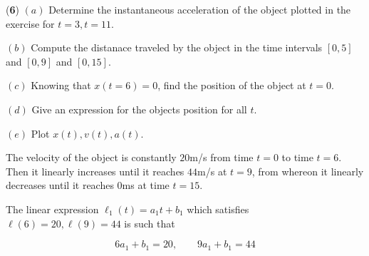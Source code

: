 \documentclass[12pt]{article}
\theoremstyle{definition}
\begin{document}
\vspace{1cm}


\vspace{1cm}


\pagebreak 

\begin{shaded}
    (\textbf{6}) $(a)$ Determine the instantaneous acceleration of the object
    plotted in the exercise for $t = 3, t = 11$.

    $(b)$ Compute the distanace traveled by the object in the time intervals
    $[0, 5]$ and $[0, 9]$ and $[0, 15]$.

    $(c)$ Knowing that $x(t = 6) = 0$, find the position of the object at $t =
    0$. 

    $(d)$ Give an expression for the objects position for all $t$. 

    $(e)$ Plot $x(t), v(t), a(t)$.
\end{shaded}

The velocity of the object is constantly $20$m/s from time $t = 0$ to time $t =
6$. Then it linearly increases until it reaches $44$m/s at $t=9$, from whereon
it linearly decreases until it reaches $0$ms at time $t = 15$.

The linear expression $\ell_1(t) = a_1t + b_1$ which satisfies $\ell(6)=20,
\ell(9) = 44$ is such that 

\begin{equation*}
    6a_1 + b_1 = 20, \qquad 9a_1 + b_1 = 44
\end{equation*}
\end{document}
